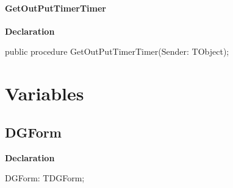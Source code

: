 \documentclass{report}
\newif\ifpdf
\begin{document}
\paragraph*{GetOutPutTimerTimer}\hspace*{\fill}

\label{dgunit.TDGForm-GetOutPutTimerTimer}
\begin{list}{}{
\setlength{\itemindent}{0cm}
\setlength{\listparindent}{0cm}
\setlength{\leftmargin}{\evensidemargin}
\addtolength{\leftmargin}{\tmplength}
\settowidth{\labelsep}{X}
\addtolength{\leftmargin}{\labelsep}
\setlength{\labelwidth}{\tmplength}
}
\item[\textbf{Declaration}\hfill]
\ifpdf
\begin{flushleft}
\fi
\begin{ttfamily}
public procedure GetOutPutTimerTimer(Sender: TObject);\end{ttfamily}

\ifpdf
\end{flushleft}
\fi

\end{list}
\section{Variables}
\ifpdf
\subsection*{\large{\textbf{DGForm}}\normalsize\hspace{1ex}\hrulefill}
\else
\subsection*{DGForm}
\fi
\label{dgunit-DGForm}
\begin{list}{}{
\setlength{\itemindent}{0cm}
\setlength{\listparindent}{0cm}
\setlength{\leftmargin}{\evensidemargin}
\addtolength{\leftmargin}{\tmplength}
\settowidth{\labelsep}{X}
\addtolength{\leftmargin}{\labelsep}
\setlength{\labelwidth}{\tmplength}
}
\item[\textbf{Declaration}\hfill]
\ifpdf
\begin{flushleft}
\fi
\begin{ttfamily}
DGForm: TDGForm;\end{ttfamily}

\ifpdf
\end{flushleft}
\fi

\end{list}
\end{document}
